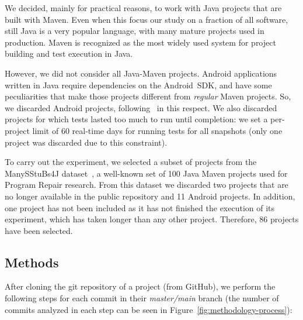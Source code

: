
We decided, mainly for practical reasons, to work with Java projects that are built with Maven. Even when this focus our study on a fraction of all software, still Java is a very popular language, with many mature projects used in production. Maven is recognized as the most widely used system for project building and test execution in Java.

However, we did not consider all Java-Maven projects. Android applications written in Java require dependencies on the Android~SDK, and have some peculiarities that make those projects different from \textit{regular} Maven projects. So, we discarded Android projects, following~\cite{Sulir:2016:QSJ:3001878.3001882} in this respect. We also discarded projects for which tests lasted too much to run until completion: we set a per-project limit of 60 real-time days for running tests for all snapshots (only one project was discarded due to this constraint).


To carry out the experiment, we selected a subset of projects from the ManySStuBs4J dataset~\cite{karampatsis2020often}, a well-known set of 100 Java Maven projects used for Program Repair research.
From this dataset we discarded two projects that are no longer available in the public repository and 11 Android projects. 
In addition, one project has not been included as it has not finished the execution of its experiment, which has taken longer than any other project.
Therefore, 86 projects have been selected.

\subsection{Methods}
\label{subsec:methods}

After cloning the git repository of a project (from GitHub), we perform the following steps for each commit in their \textit{master/main} branch (the number of commits analyzed in each step can be seen in Figure~\ref{fig:methodology-process}):

